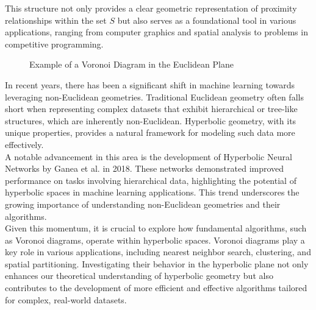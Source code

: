 \documentclass[minted, draw]{hebdomon}
\begin{document}
This structure not only provides a clear geometric representation of proximity relationships within the set \( S \) but also serves as a foundational tool in various applications, ranging from computer graphics and spatial analysis to problems in competitive programming. 

\begin{figure}
	\centering
        \caption{Example of a Voronoi Diagram in the Euclidean Plane}
        \label{fig:voronoi}
\end{figure}
%

In recent years, there has been a significant shift in machine learning towards leveraging non-Euclidean geometries. Traditional Euclidean geometry often falls short when representing complex datasets that exhibit hierarchical or tree-like structures, which are inherently non-Euclidean. Hyperbolic geometry, with its unique properties, provides a natural framework for modeling such data more effectively. \\

A notable advancement in this area is the development of Hyperbolic Neural Networks by Ganea et al. in 2018. These networks demonstrated improved performance on tasks involving hierarchical data, highlighting the potential of hyperbolic spaces in machine learning applications. This trend underscores the growing importance of understanding non-Euclidean geometries and their algorithms. \\

Given this momentum, it is crucial to explore how fundamental algorithms, such as Voronoi diagrams, operate within hyperbolic spaces. Voronoi diagrams play a key role in various applications, including nearest neighbor search, clustering, and spatial partitioning. Investigating their behavior in the hyperbolic plane not only enhances our theoretical understanding of hyperbolic geometry but also contributes to the development of more efficient and effective algorithms tailored for complex, real-world datasets.

\end{document}
